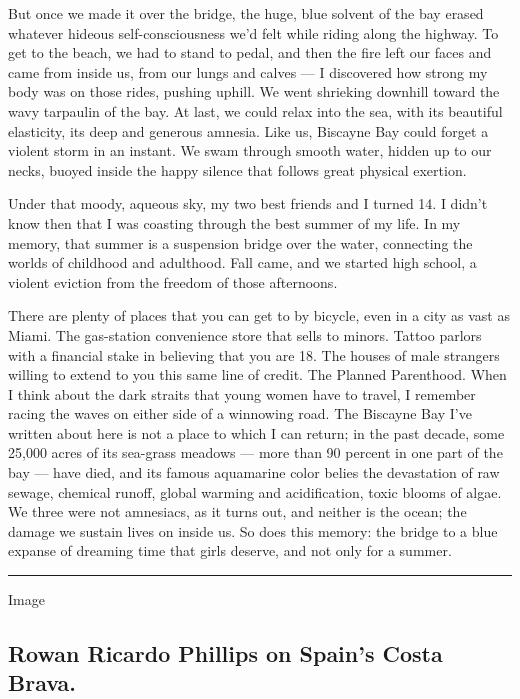 But once we made it over the bridge, the huge, blue solvent of the bay
erased whatever hideous self-consciousness we'd felt while riding along
the highway. To get to the beach, we had to stand to pedal, and then the
fire left our faces and came from inside us, from our lungs and calves
--- I discovered how strong my body was on those rides, pushing uphill.
We went shrieking downhill toward the wavy tarpaulin of the bay. At
last, we could relax into the sea, with its beautiful elasticity, its
deep and generous amnesia. Like us, Biscayne Bay could forget a violent
storm in an instant. We swam through smooth water, hidden up to our
necks, buoyed inside the happy silence that follows great physical
exertion.

Under that moody, aqueous sky, my two best friends and I turned 14. I
didn't know then that I was coasting through the best summer of my life.
In my memory, that summer is a suspension bridge over the water,
connecting the worlds of childhood and adulthood. Fall came, and we
started high school, a violent eviction from the freedom of those
afternoons.

There are plenty of places that you can get to by bicycle, even in a
city as vast as Miami. The gas-station convenience store that sells to
minors. Tattoo parlors with a financial stake in believing that you are
18. The houses of male strangers willing to extend to you this same line
of credit. The Planned Parenthood. When I think about the dark straits
that young women have to travel, I remember racing the waves on either
side of a winnowing road. The Biscayne Bay I've written about here is
not a place to which I can return; in the past decade, some 25,000 acres
of its sea-grass meadows --- more than 90 percent in one part of the bay
--- have died, and its famous aquamarine color belies the devastation of
raw sewage, chemical runoff, global warming and acidification, toxic
blooms of algae. We three were not amnesiacs, as it turns out, and
neither is the ocean; the damage we sustain lives on inside us. So does
this memory: the bridge to a blue expanse of dreaming time that girls
deserve, and not only for a summer.

\begin{center}\rule{0.5\linewidth}{\linethickness}\end{center}

Image

\hypertarget{rowan-ricardo-phillips-on-spains-costa-brava}{%
\subsection{Rowan Ricardo Phillips on Spain's Costa
Brava.}\label{rowan-ricardo-phillips-on-spains-costa-brava}}

